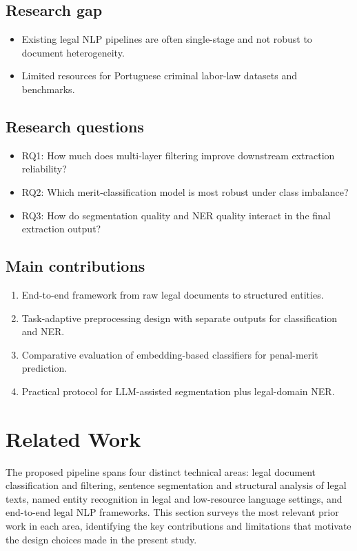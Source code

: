 \documentclass[preprint,a4paper,fleqn]{cas-dc}
\begin{document}
\subsection{Research gap}
\begin{itemize}
    \item Existing legal NLP pipelines are often single-stage and not robust to document heterogeneity.
    \item Limited resources for Portuguese criminal labor-law datasets and benchmarks.
\end{itemize}
\subsection{Research questions}
\begin{itemize}
    \item RQ1: How much does multi-layer filtering improve downstream extraction reliability?
    \item RQ2: Which merit-classification model is most robust under class imbalance?
    \item RQ3: How do segmentation quality and NER quality interact in the final extraction output?
\end{itemize}
\subsection{Main contributions}
\begin{enumerate}
    \item End-to-end framework from raw legal documents to structured entities.
    \item Task-adaptive preprocessing design with separate outputs for classification and NER.
    \item Comparative evaluation of embedding-based classifiers for penal-merit prediction.
    \item Practical protocol for LLM-assisted segmentation plus legal-domain NER.
\end{enumerate}

\section{Related Work}
\label{sec:related}

The proposed pipeline spans four distinct technical areas: legal document classification and filtering, sentence segmentation and structural analysis of legal texts, named entity recognition in legal and low-resource language settings, and end-to-end legal NLP frameworks. This section surveys the most relevant prior work in each area, identifying the key contributions and limitations that motivate the design choices made in the present study.
\end{document}
